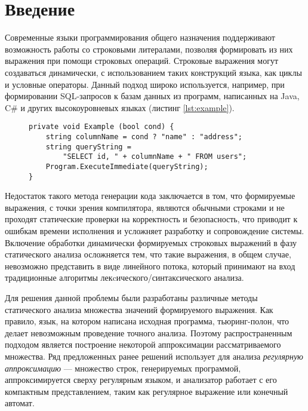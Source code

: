 \section*{Введение}
Современные языки программирования общего назначения поддерживают возможность работы со строковыми литералами, позволяя формировать из них выражения при помощи строковых операций. 
Строковые выражения могут создаваться динамически, с использованием таких конструкций языка, как циклы и условные операторы. 
Данный подход широко используется, например, при формировании SQL-запросов к базам данных из программ, написанных на Java, C$\#$ и других высокоуровневых языках (листинг \ref{lst:example}).

\begin{figure}[h]	
	\vspace{-10pt}
	\lstset{language=[Sharp]C,
		showstringspaces=false,
		basicstyle=\small,
		keywordstyle=\bfseries,,	
	}
	\begin{lstlisting}[caption={Динамически формируемый SQL-запрос}, label={lst:example}, captionpos=b]
private void Example (bool cond) {
    string columnName = cond ? "name" : "address";
    string queryString = 
        "SELECT id, " + columnName + " FROM users";
    Program.ExecuteImmediate(queryString);
}
	\end{lstlisting}
	\vspace{-10pt}
\end{figure}

Недостаток такого метода генерации кода заключается в том, что формируемые выражения, с точки зрения компилятора, являются обычными строками и не проходят статические проверки на корректность и безопасность, что приводит к ошибкам времени исполнения и усложняет разработку и сопровождение системы. 
Включение обработки динамически формируемых строковых выражений в фазу статического анализа осложняется тем, что такие выражения, в общем случае, невозможно представить в виде линейного потока, который принимают на вход традиционные алгоритмы лекcического/синтаксического анализа. 

Для решения данной проблемы были разработаны различные методы статического анализа множества значений формируемого выражения. 
Как правило, язык, на котором написана исходная программа, тьюринг-полон, что делает невозможным проведение точного анализа. Поэтому распространенным подходом является построение некоторой аппроксимации рассматриваемого множества. 
Ряд предложенных ранее решений использует для анализа \textit{регулярную аппроксимацию} --- множество строк, генерируемых программой, аппроксимируется сверху регулярным языком, и анализатор работает с его компактным представлением, таким как регулярное выражение или конечный автомат.

